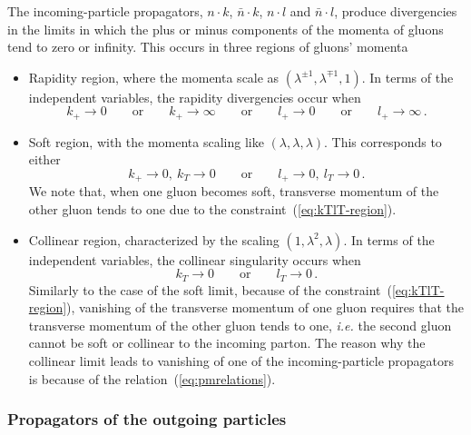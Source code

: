 \documentclass[a4paper,11pt]{article}
\newcommand{\nbar}{\ensuremath{\bar{n}}}
\newcommand{\ie}{{\it i.e. }}
\numberwithin{equation}{section}
\begin{document}
The incoming-particle propagators, $n\cdot k$, $\nbar\cdot k$, $n\cdot l$ and
$\nbar\cdot l$, produce divergencies in the limits in which the plus or minus
components of the momenta of gluons tend to zero or infinity. This occurs
in three regions of gluons' momenta
%
\begin{itemize}
  \item
  Rapidity region, where the momenta scale as 
  $(\lambda^{\pm 1},\lambda^{\mp 1},1)$. 
  In terms of the independent variables, the rapidity divergencies occur when
  \begin{equation}
    k_+ \to 0      \qquad \text{or} \qquad
    k_+ \to \infty \qquad \text{or} \qquad
    l_+ \to 0      \qquad \text{or} \qquad
    l_+ \to \infty\,.
  \end{equation}
  \item
  Soft region, with the momenta scaling like
  $(\lambda, \lambda, \lambda)$. This corresponds to either
  \begin{equation}
    k_+ \to 0,\ k_T \to 0 \qquad \text{or} \qquad
    l_+ \to 0,\ l_T \to 0\,.
    \label{eq:softlimit-var}
  \end{equation}
  We note that, when one gluon becomes
  soft, transverse momentum of the other gluon tends to one due to the
  constraint~(\ref{eq:kTlT-region}).
  \item
  Collinear region, characterized by the scaling
  $(1,\lambda^2,\lambda)$. In terms of the independent variables, the collinear
  singularity occurs when
  \begin{equation}
    k_T \to 0 \qquad \text{or} \qquad
    l_T \to 0\,.
  \end{equation}
  Similarly to the case of the soft limit, because of the
  constraint~(\ref{eq:kTlT-region}), vanishing of the transverse momentum of one
  gluon requires that the transverse momentum of the other gluon tends to
  one, \ie the second gluon cannot be soft or collinear to the incoming parton.
  The reason why the collinear limit leads to vanishing of one of the
  incoming-particle propagators is because of the
  relation~(\ref{eq:pmrelations}).
\end{itemize}

\subsubsection*{Propagators of the outgoing particles}
\end{document}
